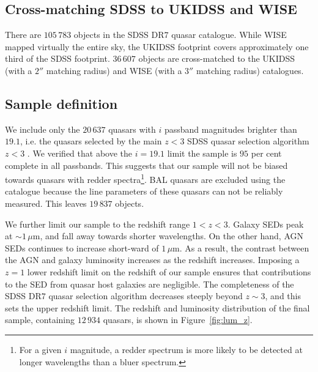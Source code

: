 \subsection{Cross-matching SDSS to UKIDSS and WISE}

There are $105\,783$ objects in the SDSS DR$7$ quasar catalogue. 
While WISE mapped virtually the entire sky, the UKIDSS footprint covers approximately one third of the SDSS footprint. 
$36\,607$ objects are cross-matched to the UKIDSS (with a $2''$ matching radius) and WISE (with a $3$$''$ matching radius) catalogues.

\subsection{Sample definition}

We include only the $20\,637$ quasars with $i$ passband magnitudes brighter than $19.1$, i.e. the quasars selected by the main $z<3$ SDSS quasar selection algorithm $z < 3$ \citep{richards02}. 
We verified that above the $i=19.1$ limit the sample is $95$ per cent complete in all passbands.
This suggests that our sample will not be biased towards quasars with redder spectra\footnote{For a given $i$ magnitude, a redder spectrum is more likely to be detected at longer wavelengths than a bluer spectrum.}. 
BAL quasars are excluded using the \citet{allen11} catalogue because the  line parameters of these quasars can not be reliably measured.
This leaves $19\,837$  objects. 

We further limit our sample to the redshift range $1 < z < 3$. 
Galaxy SEDs peak at $\sim1$\,$\mu$m, and fall away towards shorter wavelengths. 
On the other hand, AGN SEDs continues to increase short-ward of $1$\,$\mu$m. 
As a result, the contrast between the AGN and galaxy luminosity increases as the redshift increases.
Imposing a $z=1$ lower redshift limit on the redshift of our sample ensures that contributions to the SED from quasar host galaxies are negligible.
The completeness of the SDSS DR$7$ quasar selection algorithm decreases steeply beyond $z\sim3$, and this sets the upper redshift limit. 
The redshift and luminosity distribution of the final sample, containing $12\,934$ quasars, is shown in Figure~\ref{fig:lum_z}. 

